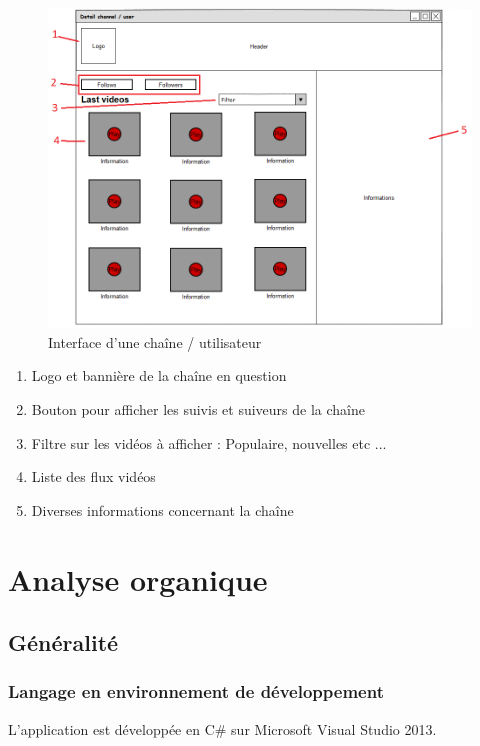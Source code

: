 \documentclass[11pt]{report} %
\begin{document}
		\begin{figure}[h]
			\center
			\includegraphics[width=1\textwidth]{../img/channelInterfacenum.png}
			\caption{Interface d'une chaîne / utilisateur}
			\label{interfacechannel}
		\end{figure}
		
		\begin{enumerate}
			\item Logo et bannière de la chaîne en question
			\item Bouton pour afficher les suivis et suiveurs de la chaîne
			\item Filtre sur les vidéos à afficher : Populaire, nouvelles etc ...
			\item Liste des flux vidéos
			\item Diverses informations concernant la chaîne
		\end{enumerate}
		
		
		
\chapter{Analyse organique}
	\section{Généralité}
		\subsection{Langage en environnement de développement}
		L'application est développée en C\# sur Microsoft Visual Studio 2013. 
		
\end{document}
